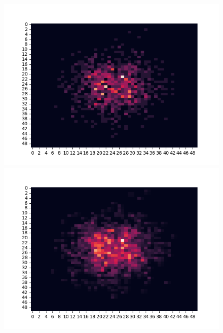 \documentclass{article}
\begin{document}
    \begin{figure}
        \centering
        \begin{minipage}{0.95\textwidth}
            \includegraphics[scale=0.7]{../images/zeroth_order.png}
        \end{minipage}
        \begin{minipage}{0.95\textwidth}
            \includegraphics[scale=0.7]{../images/first_order.png}
        \end{minipage}
        \begin{minipage}{0.95\textwidth}

\end{minipage}
\end{figure}
\end{document}
